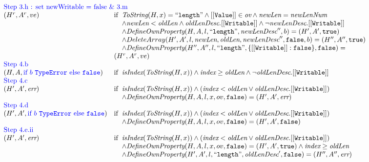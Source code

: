 \[\begin{array}{l@{}c}
{\begin{array}{ll}
\multicolumn{2}{l}{\mbox{\inblue Step 3.h : set newWritable = false \& 3.m}}\\
(H^r,A^r, ve)   &\ifc{\hf{ToString}(H, x) = ``{\tt length}" \wedge [[{\tt Value}]] \in \ov \wedge \hf{newLen} = \hf{newLenNum} \\
    \wedge \hf{newLen} < \hf{oldLen} \wedge \hf{oldLenDesc}.{\tt[[Writable]]} \wedge \neg\hf{newLenDesc}.{\tt[[Writable]]} \\
    \wedge \hf{DefineOwnProperty}(H, A, l, ``{\tt length}", \hf{newLenDesc}'', b) = (H', A', \true) \\
    \wedge DeleteArray(H', A',l, \hf{newLen}, \hf{oldLen}, \hf{newLenDesc}'', \false, b) = (H'', A'', \true)\\
    \wedge \hf{DefineOwnProperty}(H'', A'', l, ``{\tt length}", \{{\tt[[Writable]]}:\false\}, \false) =}\\
&(H^r, A^r, ve)\\

\multicolumn{2}{l}{\mbox{\inblue Step 4.b}}\\
(H,A, {\rejectb})   &\ifc{\hf{isIndex}(\hf{ToString}(H, x)) \wedge \hf{index} \geq \hf{oldLen} \wedge \neg\hf{oldLenDesc}.{\tt[[Writable]]}}\\

\multicolumn{2}{l}{\mbox{\inblue Step 4.c}}\\
(H',A', \err)   &\ifc{\hf{isIndex}(\hf{ToString}(H, x)) \wedge (\hf{index} < \hf{oldLen} \vee \hf{oldLenDesc}.{\tt[[Writable]]})\\
    \wedge \hf{DefineOwnProperty}(H, A, l, x, ov, \false) = (H', A',\err)}\\

\multicolumn{2}{l}{\mbox{\inblue Step 4.d}}\\
(H',A', {\rejectb})   &\ifc{\hf{isIndex}(\hf{ToString}(H, x)) \wedge (\hf{index} < \hf{oldLen} \vee \hf{oldLenDesc}.{\tt[[Writable]]})\\
    \wedge \hf{DefineOwnProperty}(H, A, l, x, ov, \false) = (H', A',\false)}\\

\multicolumn{2}{l}{\mbox{\inblue Step 4.e.ii}}\\
(H',A', \err)   &\ifc{\hf{isIndex}(\hf{ToString}(H, x)) \wedge (\hf{index} < \hf{oldLen} \vee \hf{oldLenDesc}.{\tt[[Writable]]})\\
    \wedge \hf{DefineOwnProperty}(H, A, l, x, ov, \false) = (H', A',\true) \wedge \hf{index} \geq \hf{oldLen}\\
    \wedge \hf{DefineOwnProperty}(H', A', l, ``{\tt length}", \hf{oldLenDesc}', \false) = (H'', A'',\err)}\\


\end{array}}
\end{array}\]
